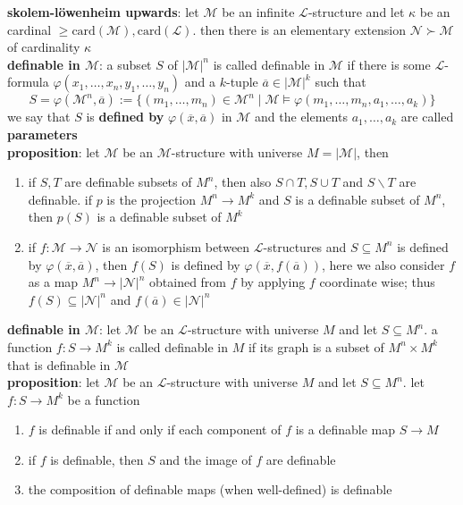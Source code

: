 \documentclass[a4paper]{article}
\newcommand\abs[1]{\ensuremath{\lvert#1\rvert}}
\begin{document}
\begin{framed}
	\noindent
	\textbf{skolem-l\"owenheim upwards}: let $\mathscr{M}$ be an infinite $\mathscr{L}$-structure and let $\kappa$ be an cardinal $\geq \text{card}(\mathscr{M}), \text{card}(\mathscr{L})$. then there is an elementary extension $\mathscr{N} \succ \mathscr{M}$ of cardinality $\kappa$\\
	
	\noindent
	\textbf{definable in $\mathscr{M}$}: a subset $S$ of $\abs{\mathscr{M}}^n$ is called definable in $\mathscr{M}$ if there is some $\mathscr{L}$-formula $\varphi(x_1, \dots, x_n, y_1, \dots, y_n)$ and a $k$-tuple $\overline{a} \in \abs{\mathscr{M}}^k$ such that 
	$$S = \varphi(\mathscr{M}^n, \overline{a}) := \{(m_1, \dots, m_n) \in \mathscr{M}^n \; \vert \; \mathscr{M} \models \varphi(m_1, \dots, m_n, a_1, \dots, a_k)\}$$
	we say that $S$ is \textbf{defined by} $\varphi(\overline{x}, \overline{a})$ in $\mathscr{M}$ and the elements $a_1, \dots, a_k$ are called \textbf{parameters}\\
	
	\noindent
	\textbf{proposition}: let $\mathscr{M}$ be an $\mathscr{M}$-structure with universe $M = \abs{\mathscr{M}}$, then
	\begin{enumerate}[label=(\roman*), itemsep=-3pt, topsep=0pt]
		\item if $S, T$ are definable subsets of $M^n$, then also $S \cap T, S \cup T$ and $S \backslash T$ are definable. if $p$ is the projection $M^n \rightarrow M^k$ and $S$ is a definable subset of $M^n$, then $p(S)$ is a definable subset of $M^k$
		\item if $f: \mathscr{M} \rightarrow \mathscr{N}$ is an isomorphism between $\mathscr{L}$-structures and $S \subseteq M^n$ is defined by $\varphi(\overline{x}, \overline{a})$, then $f(S)$ is defined by $\varphi(\overline{x}, f(\overline{a}))$, here we also consider $f$ as a map $M^n \rightarrow \abs{\mathscr{N}}^n$ obtained from $f$ by applying $f$ coordinate wise; thus $f(S) \subseteq \abs{\mathscr{N}}^n$ and $f(\overline{a}) \in \abs{\mathscr{N}}^n$\\
	\end{enumerate}
	
	\noindent
	\textbf{definable in $\mathscr{M}$}: let $\mathscr{M}$ be an $\mathscr{L}$-structure with universe $M$ and let $S \subseteq M^n$. a function $f: S \rightarrow M^k$ is called definable in $M$ if its graph is a subset of $M^n \times M^k$ that is definable in $\mathscr{M}$\\
	
	\noindent
	\textbf{proposition}: let $\mathscr{M}$ be an $\mathscr{L}$-structure with universe $M$ and let $S \subseteq M^n$. let $f: S \rightarrow M^k$ be a function
	\begin{enumerate}[label=(\roman*), itemsep=-3pt, topsep=0pt]
		\item $f$ is definable if and only if each component of $f$ is a definable map $S \rightarrow M$
		\item if $f$ is definable, then $S$ and the image of $f$ are definable
		\item the composition of definable maps (when well-defined) is definable\\
	\end{enumerate}
	

\end{framed}
\end{document}
